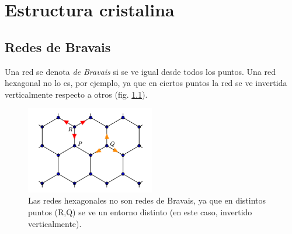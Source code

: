 \part{Estructura cristalina}

\chapter{Redes de Bravais}
Una red se denota \emph{de Bravais} si se ve igual desde todos los
puntos. Una red hexagonal no lo es, por ejemplo, ya que en ciertos
puntos la red se ve invertida verticalmente respecto a otros (fig. \ref{fig:hexa}).
\begin{figure}
  \centering
  \includegraphics[width=0.5\textwidth]{figures/hexa.png}
  \caption{Las redes hexagonales no son redes de Bravais, ya que en
    distintos puntos (R,Q) se ve un entorno distinto (en este caso,
    invertido verticalmente).}
  \label{fig:hexa}
\end{figure}

